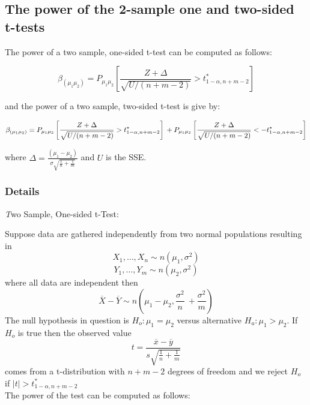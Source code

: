 \documentclass[12pt,a4paper]{article}
\theoremstyle{regla}
\theoremstyle{remark}
\theoremstyle{definition}
\theoremstyle{nonumberbreak}
\begin{document}
\subsection{The power of the 2-sample one and two-sided t-tests}
\begin{fbox}
\begin{minipage}{0.97\textwidth}
The power of a two sample, one-sided t-test can be computed as follows:

$$ \beta_{(\mu_1\mu_2)} = P_{\mu_1\mu_2}\left[ \frac{Z + \Delta}{\sqrt{U/(n+m-2)}} > t^\ast_{1-\alpha,n+m-2} \right] $$

and the power of a two sample, two-sided t-test is give by: 

$$\beta_{(\mu_1\mu_2)} = P_{\mu_1\mu_2}\left[ \frac{Z + \Delta}{\sqrt{U/(n+m-2)}} > t^\ast_{1-\alpha,n+m-2} \right]\\
+P_{\mu_1\mu_2}\left[ \frac{Z + \Delta}{\sqrt{U/(n+m-2)}} < -t^\ast_{1-\alpha,n+m-2} \right]$$

where $\Delta = \frac{(\mu_1-\mu_2)}{\sigma\sqrt{\frac{1}{n}+\frac{1}{m}}} $ and 
$U$ is the SSE.\\



\end{minipage}
\end{fbox}
\subsubsection{Details}
{\emph Two Sample, One-sided t-Test}:

Suppose data are gathered independently from two normal populations resulting in
 $$X_1, \ldots, X_n \sim n(\mu_1, \sigma^2)$$
 $$Y_1, \ldots, Y_m \sim n(\mu_2, \sigma^2)$$
where all data are independent then $$ \overline{X}-\overline{Y} \sim n(\mu_1 - \mu_2, \frac{\sigma^2}{n}\ + \frac{\sigma^2}{m})$$
The null hypothesis in question is $H_o: \mu_1 = \mu_2$ versus alternative $H_a: \mu_1 > \mu_2$.
If $H_o$ is true then the observed value
$$ t = \frac{\overline{x}-\overline{y}}{s\sqrt{\frac{1}{n}+\frac{1}{m}}} $$
comes from a t-distribution with $n+m-2$ degrees of freedom and we reject $H_o$ if $\left|t \right|> t^\ast_{1-\alpha,n+m-2}$\\

The power of the test can be computed as follows:
\end{document}

